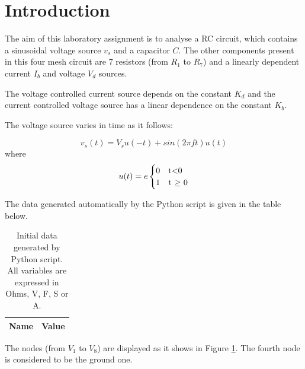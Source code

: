 \section{Introduction}
\label{introduction}


\par The aim of this laboratory assignment is to analyse a RC circuit, which contains a sinusoidal voltage source $v_s$ and a capacitor $C$. The other components present in this four mesh circuit are 7 resistors (from $R_1$ to $R_7$) and a linearly dependent current $I_b$ and voltage $V_d$ sources.
\par The voltage controlled current source depends on the constant $K_d$ and the current controlled voltage source has a linear dependence on the constant $K_b$.

\par The voltage source varies in time as it follows:

\begin{equation}
v_s(t) = V_s u(-t) + sin(2 \pi f t)u(t)
\label {equation:n1}
\end{equation}
where
\begin{equation}
u(t)=e
\begin{cases}
0 & $t$ < $0$ \\
1 & $t $\geq$ 0$
\end{cases}
\label {eq:n2}
\end{equation}

\par The data generated automatically by the Python script is given in the table below.

\begin{table}[ht]
  \centering
  \begin{tabular}{|l|r|}
    \hline    
    {\bf Name} & {\bf Value} \\ \hline
    
  \end{tabular}
  \caption{Initial data generated by Python script. All variables are expressed in Ohms, V, F, S or A.}
  \label{tab:initial_data}
\end{table}



\par The nodes (from $V_1$ to $V_8$) are displayed as it shows in Figure \ref{tab:initial_data}. The fourth node is considered to be the ground one.


\par
   

